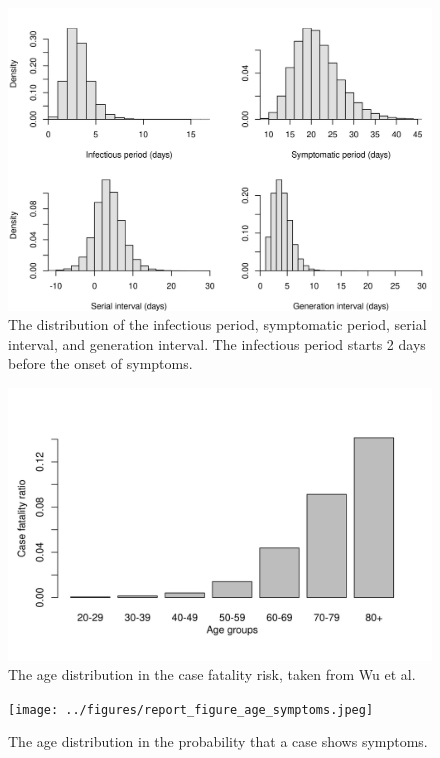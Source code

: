 \documentclass[11pt]{article}
\begin{document}
\begin{figure}[hb!]
\centering
\includegraphics[width=\textwidth]{../figures/report_figure_parameter_periods.jpeg} 
\caption{\label{fig_params_periods}The distribution of the infectious period, symptomatic period, serial interval, and generation interval. The infectious period starts 2 days before the onset of symptoms.}
\end{figure}


\begin{figure}[hb!]
\centering
\includegraphics[width=\textwidth]{../figures/report_figure_age_CFR.jpeg} 
\caption{\label{fig_age_cfr} The age distribution in the case fatality risk, taken from Wu et al.}
\end{figure}

\begin{figure}[hb!]
\centering
\texttt{[image: ../figures/report\_figure\_age\_symptoms.jpeg]} 
\caption{\label{fig_age_symp} The age distribution in the probability that a case shows symptoms.}
\end{figure}
\end{document}
